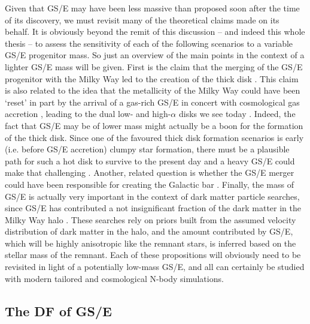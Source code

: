 Given that GS/E may have been less massive than proposed soon after the time of its discovery, we must revisit many of the theoretical claims made on its behalf. It is obviously beyond the remit of this discussion -- and indeed this whole thesis -- to assess the sensitivity of each of the following scenarios to a variable GS/E progenitor mass. So just an overview of the main points in the context of a lighter GS/E mass will be given. First is the claim that the merging of the GS/E progenitor with the Milky Way led to the creation of the thick disk \parencite[e.g.][]{helmi18,gallart19}. This claim is also related to the idea that the metallicity of the Milky Way could have been `reset' in part by the arrival of a gas-rich GS/E in concert with cosmological gas accretion \parencite[e.g.][]{grand20,renaud21,ciuca24}, leading to the dual low- and high-$\alpha$ disks we see today \parencite[see also the two-infall model of e.g.][]{chiappini97}. Indeed, the fact that GS/E may be of lower mass might actually be a boon for the formation of the thick disk. Since one of the favoured thick disk formation scenarios is early (i.e. before GS/E accretion) clumpy star formation, there must be a plausible path for such a hot disk to survive to the present day and a heavy GS/E could make that challenging \parencite[see e.g. arguments for this in][]{deason24}. Another, related question is whether the GS/E merger could have been responsible for creating the Galactic bar \parencite{merrow23}. Finally, the mass of GS/E is actually very important in the context of dark matter particle searches, since GS/E has contributed a not insignificant fraction of the dark matter in the Milky Way halo \parencite{necib19,evans19}. These searches rely on priors built from the assumed velocity distribution of dark matter in the halo, and the amount contributed by GS/E, which will be highly anisotropic like the remnant stars, is inferred based on the stellar mass of the remnant. Each of these propositions will obviously need to be revisited in light of a potentially low-mass GS/E, and all can certainly be studied with modern tailored and cosmological N-body simulations. 

\subsection{The DF of GS/E}

